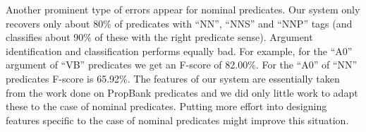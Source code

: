 
Another prominent type of errors appear for nominal predicates. Our system only recovers only about 80\% of predicates with ``NN'', ``NNS'' and ``NNP'' tags (and classifies about 90\% of these with the right predicate sense). Argument identification and classification performs equally bad. For example, for the ``A0'' argument of ``VB'' predicates we get an F-score of 82.00\%. For the ``A0'' of ``NN'' predicates F-score is 65.92\%. The features of our system are essentially taken from the work done on PropBank predicates and we did only little work to adapt these to the case of nominal predicates. Putting more effort into designing features specific to the case of nominal predicates might improve this situation.






